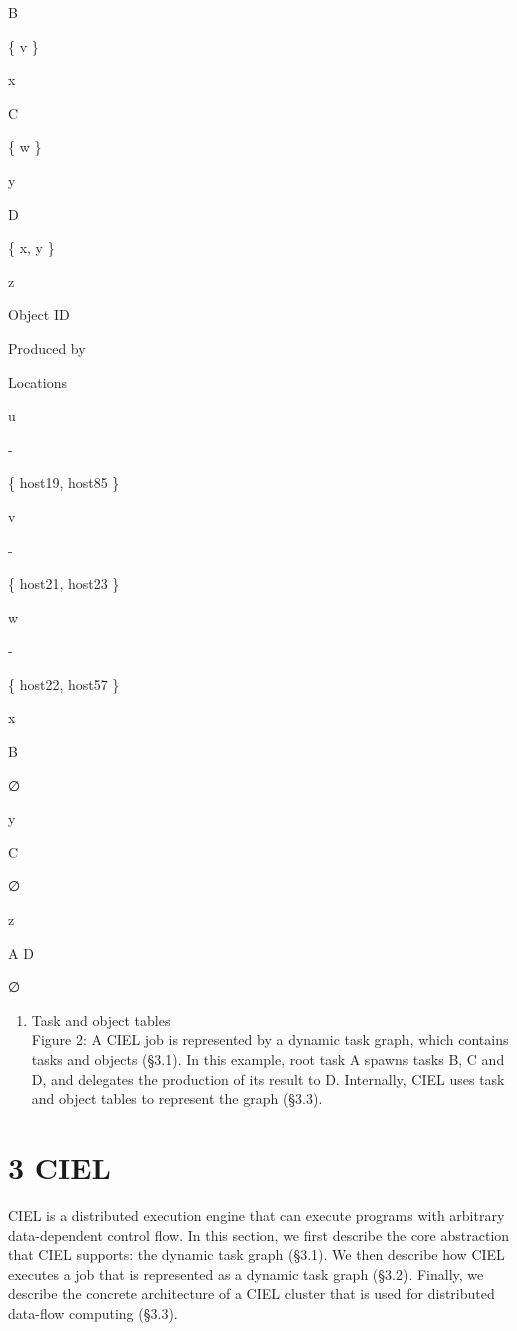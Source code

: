 \documentclass[
]{article}
\providecommand{\tightlist}{%
  \setlength{\itemsep}{0pt}\setlength{\parskip}{0pt}}
\begin{document}
B

\{ v \}

x

C

\{ w \}

y

D

\{ x, y \}

z

Object ID

Produced by

Locations

u

-

\{ host19, host85 \}

v

-

\{ host21, host23 \}

w

-

\{ host22, host57 \}

x

B

∅

y

C

∅

z

A D

∅

\begin{enumerate}
\def\labelenumi{(\alph{enumi})}
\setcounter{enumi}{1}
\tightlist
\item
  Task and object tables\\
  Figure 2: A CIEL job is represented by a dynamic task graph, which
  contains tasks and objects (§3.1). In this example, root task A spawns
  tasks B, C and D, and delegates the production of its result to D.
  Internally, CIEL uses task and object tables to represent the graph
  (§3.3).
\end{enumerate}

\section{3 CIEL}\label{ciel}

CIEL is a distributed execution engine that can execute programs with
arbitrary data-dependent control flow. In this section, we first
describe the core abstraction that CIEL supports: the dynamic task graph
(§3.1). We then describe how CIEL executes a job that is represented as
a dynamic task graph (§3.2). Finally, we describe the concrete
architecture of a CIEL cluster that is used for distributed data-flow
computing (§3.3).
\end{document}
